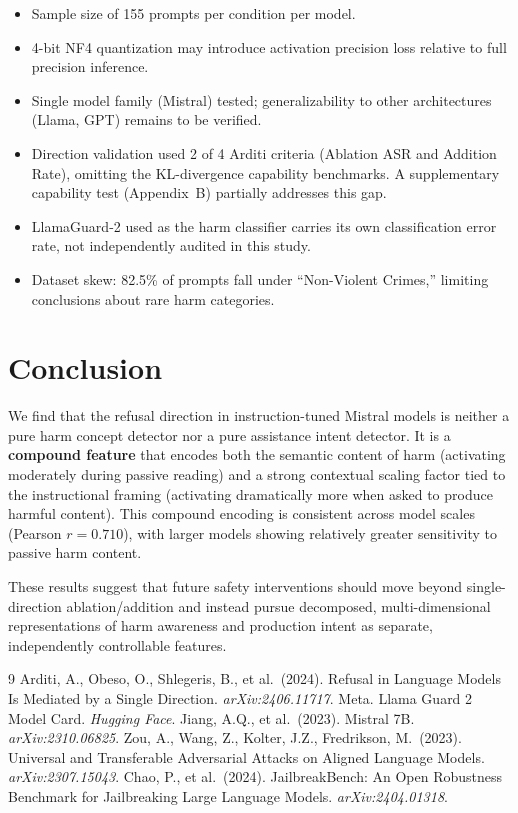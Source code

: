 \documentclass[12pt]{article}
\begin{document}
\begin{itemize}
    \item Sample size of 155 prompts per condition per model.
    \item 4-bit NF4 quantization may introduce activation precision loss relative to full precision inference.
    \item Single model family (Mistral) tested; generalizability to other architectures (Llama, GPT) remains to be verified.
    \item Direction validation used 2 of 4 Arditi criteria (Ablation ASR and Addition Rate), omitting the KL-divergence capability benchmarks. A supplementary capability test (Appendix~B) partially addresses this gap.
    \item LlamaGuard-2 used as the harm classifier carries its own classification error rate, not independently audited in this study.
    \item Dataset skew: 82.5\% of prompts fall under ``Non-Violent Crimes,'' limiting conclusions about rare harm categories.
\end{itemize}

\section{Conclusion}

We find that the refusal direction in instruction-tuned Mistral models is neither a pure harm concept detector nor a pure assistance intent detector. It is a \textbf{compound feature} that encodes both the semantic content of harm (activating moderately during passive reading) and a strong contextual scaling factor tied to the instructional framing (activating dramatically more when asked to produce harmful content). This compound encoding is consistent across model scales (Pearson $r=0.710$), with larger models showing relatively greater sensitivity to passive harm content.

These results suggest that future safety interventions should move beyond single-direction ablation/addition and instead pursue decomposed, multi-dimensional representations of harm awareness and production intent as separate, independently controllable features.

\begin{thebibliography}{9}
 Arditi, A., Obeso, O., Shlegeris, B., et al.\ (2024). Refusal in Language Models Is Mediated by a Single Direction. \textit{arXiv:2406.11717}.
 Meta. Llama Guard 2 Model Card. \textit{Hugging Face}.
 Jiang, A.Q., et al.\ (2023). Mistral 7B. \textit{arXiv:2310.06825}.
 Zou, A., Wang, Z., Kolter, J.Z., Fredrikson, M.\ (2023). Universal and Transferable Adversarial Attacks on Aligned Language Models. \textit{arXiv:2307.15043}.
 Chao, P., et al.\ (2024). JailbreakBench: An Open Robustness Benchmark for Jailbreaking Large Language Models. \textit{arXiv:2404.01318}.
\end{thebibliography}
\end{document}
